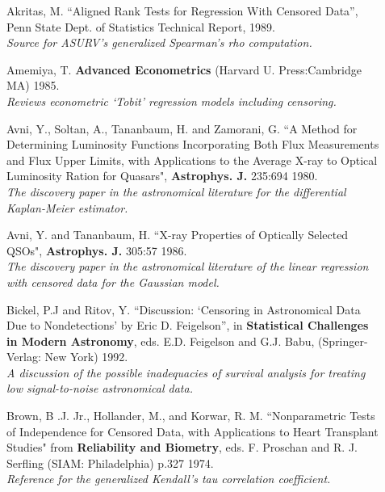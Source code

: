 \begin{description}
\item [] Akritas, M. ``Aligned Rank Tests for Regression With Censored Data'',
   Penn State Dept. of Statistics Technical Report, 1989. \\
   {\it Source for ASURV's generalized Spearman's rho computation.}

\item [] Amemiya, T.  {\bf Advanced Econometrics} (Harvard U. Press:Cambridge 
   MA) 1985. \\
   {\it Reviews econometric `Tobit' regression models including censoring.}

\item [] Avni, Y., Soltan, A., Tananbaum, H. and Zamorani, G. ``A Method for 
   Determining Luminosity Functions Incorporating Both Flux Measurements 
   and Flux Upper Limits, with Applications to the Average X-ray to Optical 
   Luminosity Ration for Quasars", {\bf Astrophys. J.} 235:694 1980. \\
   {\it The discovery paper in the astronomical literature for the 
   differential Kaplan-Meier estimator.}

\item [] Avni, Y. and Tananbaum, H. ``X-ray Properties of Optically Selected 
    QSOs",     {\bf Astrophys. J.} 305:57 1986. \\
   {\it The discovery paper in the astronomical literature of the linear 
    regression with censored data for the Gaussian model.}

\item [] Bickel, P.J and Ritov, Y. ``Discussion:  `Censoring in 
    Astronomical Data Due
    to Nondetections' by Eric D. Feigelson'', in {\bf Statistical Challenges
    in Modern Astronomy}, eds. E.D. Feigelson and G.J. Babu, (Springer-Verlag:
    New York) 1992. \\
    {\it A discussion of the possible inadequacies of survival analysis for
    treating low signal-to-noise astronomical data.}

\item [] Brown, B .J. Jr., Hollander, M., and Korwar, R. M. ``Nonparametric 
    Tests of Independence for Censored Data, with Applications to Heart 
    Transplant Studies" from {\bf Reliability and Biometry}, eds. F. Proschan 
    and R. J. Serfling (SIAM: Philadelphia) p.327 1974.\\
    {\it Reference for the generalized Kendall's tau correlation coefficient.}


\end{description}
